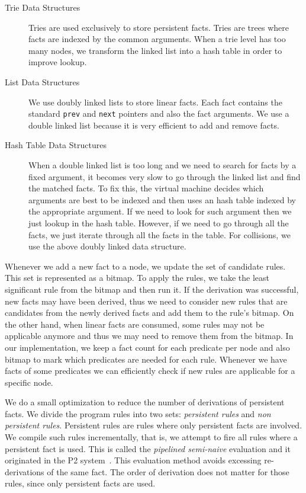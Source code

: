 \begin{description}
   \item[Trie Data Structures]

   Tries are used exclusively to store persistent facts.
   Tries are trees where facts are indexed by the common arguments. When a trie level has too many nodes, we
   transform the linked list into a hash table in order to improve lookup.
      
   \item[List Data Structures]
   
   We use doubly linked lists to store linear facts. Each fact contains the standard \texttt{prev} and \texttt{next} pointers
   and also the fact arguments. We use a double linked list because it is very efficient to add and remove facts.
   
   \item[Hash Table Data Structures]
   
   When a double linked list is too long and we need to search for facts by a fixed argument, it becomes very slow to go through the
   linked list and find the matched facts. To fix this, the virtual machine decides which arguments are best to be indexed and then
   uses an hash table indexed by the appropriate argument. If we need to look for such argument then we just lookup in the hash table. However,
   if we need to go through all the facts, we just iterate through all the facts in the table. For collisions, we use the above doubly linked
   data structure.
\end{description}

Whenever we add a new fact to a node, we update the set of candidate rules. This set is represented as a bitmap.
To apply the rules, we take the least significant rule from the bitmap and then run it.
If the derivation was successful, new facts may have been derived, thus we need to consider new
rules that are candidates from the newly derived facts and add them to the rule's bitmap.
On the other hand, when linear facts are consumed, some rules may not be applicable anymore and thus
we may need to remove them from the bitmap. In our implementation,
we keep a fact count for each predicate per node and also bitmap to mark which predicates are needed for each rule. Whenever we have facts of some
predicates we can efficiently check if new rules are applicable for a specific node.

We do a small optimization to reduce the number of derivations of persistent facts. We
divide the program rules into two sets: \emph{persistent rules} and \emph{non persistent rules}.
Persistent rules are rules where only persistent facts are involved. We compile such rules
incrementally, that is, we attempt to fire all rules where a persistent fact is used. This is called
the \emph{pipelined semi-naive} evaluation and it originated in the P2 system~\cite{Loo-condie-garofalakis-p2}.
This evaluation method avoids excessing re-derivations of the same fact. The order of derivation does not matter for those rules, since
only persistent facts are used.

